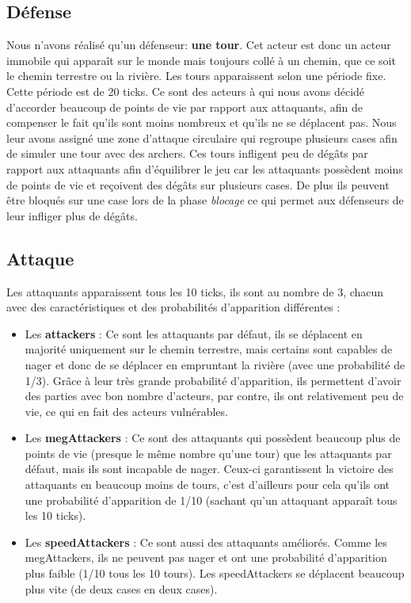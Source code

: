 \documentclass{article}
\begin{document}
\subsection{Défense}
Nous n'avons réalisé qu'un défenseur: \textbf{une tour}. Cet acteur est donc un acteur immobile qui apparaît sur le monde mais toujours collé à un chemin, que ce soit le chemin terrestre ou la rivière. Les tours apparaissent selon une période fixe. Cette période est de 20 ticks. Ce sont des acteurs à qui nous avons décidé d'accorder beaucoup de points de vie par rapport aux attaquants, afin de compenser le fait qu'ils sont moins nombreux et qu'ils ne se déplacent pas. Nous leur avons assigné une zone d'attaque circulaire qui regroupe plusieurs cases afin de simuler une tour avec des archers. Ces tours infligent peu de dégâts par rapport aux attaquants afin d'équilibrer le jeu car les attaquants possèdent moins de points de vie et reçoivent des dégâts sur plusieurs cases. De plus ils peuvent être bloqués sur une case lors de la phase \textit{blocage} ce qui permet aux défenseurs de leur infliger plus de dégâts.

\subsection{Attaque}
Les attaquants apparaissent tous les 10 ticks, ils sont au nombre de 3, chacun avec des caractéristiques et des probabilités d'apparition différentes :\\

\begin{itemize}
\item Les \textbf{attackers} : Ce sont les attaquants par défaut, ils se déplacent en majorité uniquement sur le chemin terrestre, mais certains sont capables de nager et donc de se déplacer en empruntant la rivière (avec une probabilité de 1/3). Grâce à leur très grande probabilité d'apparition, ils permettent d'avoir des parties avec bon nombre d'acteurs, par contre, ils ont relativement peu de vie, ce qui en fait des acteurs vulnérables.\\

\item Les \textbf{megAttackers} : Ce sont des attaquants qui possèdent beaucoup plus de points de vie (presque le même nombre qu'une tour) que les attaquants par défaut, mais ils sont incapable de nager. Ceux-ci garantissent la victoire des attaquants en beaucoup moins de tours, c'est d'ailleurs pour cela qu'ils ont une probabilité d'apparition de 1/10 (sachant qu'un attaquant apparaît tous les 10 ticks).\\

\item Les \textbf{speedAttackers} : Ce sont aussi des attaquants améliorés. Comme les megAttackers, ils ne peuvent pas nager et ont une probabilité d'apparition plus faible (1/10 tous les 10 tours). Les speedAttackers se déplacent beaucoup plus vite (de deux cases en deux cases).\\
\end{itemize}
\end{document}
